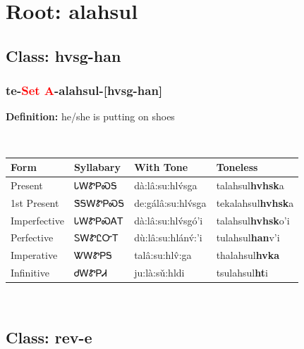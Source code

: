 \needspace{4in}
\section*{Root: alahsul}
\nopagebreak
{}
\needspace{3in}
\subsection*{Class: hvsg-han}
\nopagebreak
\needspace{2in}
\subsubsection*{te{-}\textcolor{Red}{Set A}{-}\textbf{alahsul}{-}[hvsg-han]}
\nopagebreak
\textbf{Definition: } he/she is putting on shoes
\\[0.5em]
\begin{tabularx}{\textwidth}{l X X X}%
\toprule%
\textbf{Form}&\textbf{Syllabary}&\textbf{With Tone}&\textbf{Toneless}\\%
\midrule%
Present&ᏓᎳᏑᏢᏍᎦ&dà:lâ:su:hlv́sga&talahsul\textbf{hvhsk}a\\%
1st Present&ᏕᎦᎳᏑᏢᏍᎦ&de:gálâ:su:hlv́sga&tekalahsul\textbf{hvhsk}a\\%
Imperfective&ᏓᎳᏑᏢᏍᎪᎢ&dà:lâ:su:hlv́sgó’i&talahsul\textbf{hvhsk}o'i\\%
Perfective&ᏚᎳᏑᏝᏅᎢ&dù:lâ:su:hlánv́:’i&tulahsul\textbf{han}v'i\\%
Imperative&ᏔᎳᏑᏢᎦ&talâ:su:hlv̂:ga&thalahsul\textbf{hvka}\\%
Infinitive&ᏧᎳᏑᏢᏗ&ju:là:sǔ:hldi&tsulahsul\textbf{ht}i\\%
\bottomrule%
\end{tabularx}
\\[1em]
\needspace{3in}
\subsection*{Class: rev-e}
\nopagebreak
\needspace{2in}
